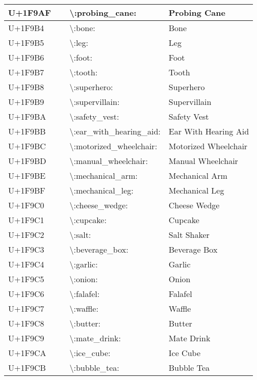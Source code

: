 \begin{table}[h]
\begin{tabulary}{\linewidth}{|L|L|L|L|}
\hline
U+1F9AF & 🦯 & {\textbackslash}:probing\_cane: & Probing Cane \\
\hline
U+1F9B4 & 🦴 & {\textbackslash}:bone: & Bone \\
\hline
U+1F9B5 & 🦵 & {\textbackslash}:leg: & Leg \\
\hline
U+1F9B6 & 🦶 & {\textbackslash}:foot: & Foot \\
\hline
U+1F9B7 & 🦷 & {\textbackslash}:tooth: & Tooth \\
\hline
U+1F9B8 & 🦸 & {\textbackslash}:superhero: & Superhero \\
\hline
U+1F9B9 & 🦹 & {\textbackslash}:supervillain: & Supervillain \\
\hline
U+1F9BA & 🦺 & {\textbackslash}:safety\_vest: & Safety Vest \\
\hline
U+1F9BB & 🦻 & {\textbackslash}:ear\_with\_hearing\_aid: & Ear With Hearing Aid \\
\hline
U+1F9BC & 🦼 & {\textbackslash}:motorized\_wheelchair: & Motorized Wheelchair \\
\hline
U+1F9BD & 🦽 & {\textbackslash}:manual\_wheelchair: & Manual Wheelchair \\
\hline
U+1F9BE & 🦾 & {\textbackslash}:mechanical\_arm: & Mechanical Arm \\
\hline
U+1F9BF & 🦿 & {\textbackslash}:mechanical\_leg: & Mechanical Leg \\
\hline
U+1F9C0 & 🧀 & {\textbackslash}:cheese\_wedge: & Cheese Wedge \\
\hline
U+1F9C1 & 🧁 & {\textbackslash}:cupcake: & Cupcake \\
\hline
U+1F9C2 & 🧂 & {\textbackslash}:salt: & Salt Shaker \\
\hline
U+1F9C3 & 🧃 & {\textbackslash}:beverage\_box: & Beverage Box \\
\hline
U+1F9C4 & 🧄 & {\textbackslash}:garlic: & Garlic \\
\hline
U+1F9C5 & 🧅 & {\textbackslash}:onion: & Onion \\
\hline
U+1F9C6 & 🧆 & {\textbackslash}:falafel: & Falafel \\
\hline
U+1F9C7 & 🧇 & {\textbackslash}:waffle: & Waffle \\
\hline
U+1F9C8 & 🧈 & {\textbackslash}:butter: & Butter \\
\hline
U+1F9C9 & 🧉 & {\textbackslash}:mate\_drink: & Mate Drink \\
\hline
U+1F9CA & 🧊 & {\textbackslash}:ice\_cube: & Ice Cube \\
\hline
U+1F9CB & 🧋 & {\textbackslash}:bubble\_tea: & Bubble Tea \\

\end{tabulary}
\end{table}
